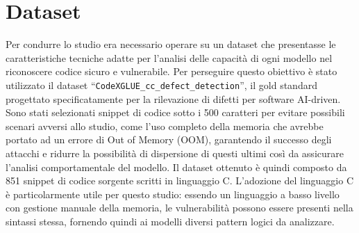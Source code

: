 \section{Dataset}
Per condurre lo studio era necessario operare su un dataset che presentasse le caratteristiche tecniche adatte per l'analisi delle capacità di ogni modello nel riconoscere codice sicuro e vulnerabile.
Per perseguire questo obiettivo è stato utilizzato il dataset \enquote{\texttt{CodeXGLUE\_cc\_defect\_detection}}\cite{dataset}, il gold standard progettato specificatamente per la rilevazione di difetti per software AI-driven.
Sono stati selezionati snippet di codice sotto i 500 caratteri per evitare possibili scenari avversi allo studio, come l'uso completo della memoria che avrebbe portato ad un errore di Out of Memory (OOM), garantendo il successo degli attacchi e ridurre la possibilità di dispersione di questi ultimi così da assicurare l'analisi comportamentale del modello.
Il dataset ottenuto è quindi composto da 851 snippet di codice sorgente scritti in linguaggio C. L'adozione del linguaggio C è particolarmente utile per questo studio: essendo un linguaggio a basso livello con gestione manuale della memoria, le vulnerabilità possono essere presenti nella sintassi stessa, fornendo quindi ai modelli diversi pattern logici da analizzare.

